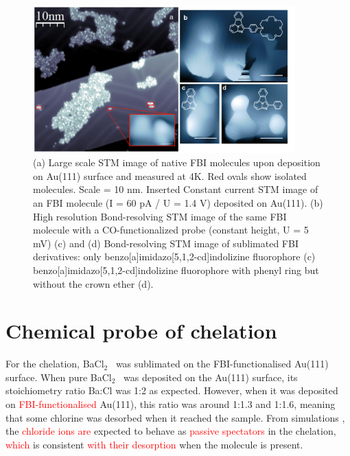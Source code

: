 \documentclass[aps,prl,reprint,longbibliography,superscriptaddress, english]{revtex4-1}
\def\BappCl{BaCl$_2$ }
\begin{document}
\begin{figure}[ht!]
	\includegraphics[width=0.9\textwidth]{figures/fig3_STM.pdf}
	\caption{\label{FIG_BRSTM.png} 
    (a) Large scale STM image of native FBI molecules upon deposition on Au(111) surface and measured at 4K. Red ovals show isolated molecules. Scale = 10 nm. Inserted Constant current STM image of an FBI molecule (I = 60 pA / U = 1.4 V) deposited on Au(111). (b) High resolution Bond-resolving STM image of the same FBI molecule with a CO-functionalized probe (constant height, U = 5 mV) (c) and (d) Bond-resolving STM image of sublimated FBI derivatives: only benzo[a]imidazo[5,1,2-cd]indolizine fluorophore (c) benzo[a]imidazo[5,1,2-cd]indolizine fluorophore with phenyl ring but without the crown ether (d).}
\end{figure}

\section{Chemical probe of chelation}
For the chelation, \BappCl\ was sublimated on the FBI-functionalised Au(111) surface. When pure \BappCl\ was deposited on the Au(111) surface, its stoichiometry ratio Ba:Cl was 1:2 as expected. However, when it was deposited on \textcolor{red}{FBI-functionalised} Au(111), this ratio was around 1:1.3 and 1:1.6, meaning that some chlorine was desorbed when it reached the sample. From simulations \cite{rivilla_fluorescent_2020}, the \textcolor{red}{chloride ions are} expected to behave as \textcolor{red}{passive spectators} in the chelation, \textcolor{red}{which} is consistent \textcolor{red}{with their desorption} when the molecule is present.
\end{document}
